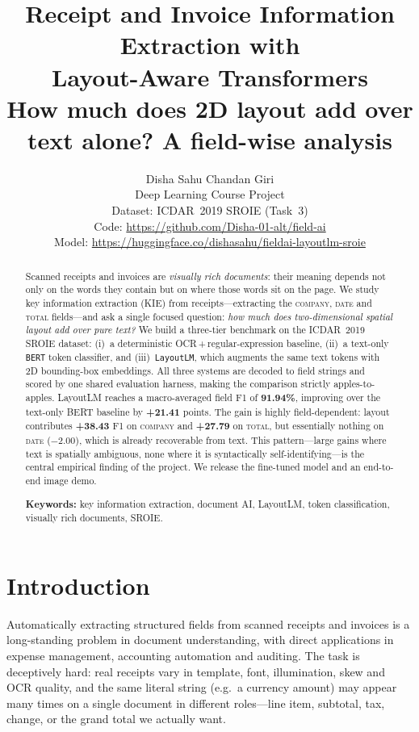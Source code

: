\documentclass[11pt]{article}
\title{\textbf{Receipt and Invoice Information Extraction with\\
Layout-Aware Transformers}\\[0.4em]
\large How much does 2D layout add over text alone? A field-wise analysis}
\author{
\large Disha Sahu \quad Chandan Giri\\[0.5em]
\normalsize Deep Learning Course Project\\[0.6em]
\small Dataset: ICDAR~2019 SROIE (Task~3)\\[0.3em]
\small Code: \url{https://github.com/Disha-01-alt/field-ai}\\[0.3em]
\small Model: \url{https://huggingface.co/dishasahu/fieldai-layoutlm-sroie}
}
\date{}
\begin{document}
\maketitle

\begin{abstract}
\noindent
Scanned receipts and invoices are \emph{visually rich documents}: their meaning
depends not only on the words they contain but on where those words sit on the
page. We study key information extraction (KIE) from receipts---extracting the
\textsc{company}, \textsc{date} and \textsc{total} fields---and ask a single
focused question: \emph{how much does two-dimensional spatial layout add over
pure text?} We build a three-tier benchmark on the ICDAR~2019 SROIE dataset:
(i)~a deterministic OCR\,+\,regular-expression baseline, (ii)~a text-only
\texttt{BERT} token classifier, and (iii)~\texttt{LayoutLM}, which augments the
same text tokens with 2D bounding-box embeddings. All three systems are decoded
to field strings and scored by one shared evaluation harness, making the
comparison strictly apples-to-apples. LayoutLM reaches a macro-averaged
field F1 of \textbf{91.94\%}, improving over the text-only BERT baseline by
\textbf{+21.41} points. The gain is highly field-dependent: layout contributes
\textbf{+38.43} F1 on \textsc{company} and \textbf{+27.79} on \textsc{total},
but essentially nothing on \textsc{date} ($-2.00$), which is already recoverable
from text. This pattern---large gains where text is spatially ambiguous, none
where it is syntactically self-identifying---is the central empirical finding
of the project. We release the fine-tuned model and an end-to-end image demo.

\medskip
\noindent\textbf{Keywords:} key information extraction, document AI, LayoutLM,
token classification, visually rich documents, SROIE.
\end{abstract}

\section{Introduction}
Automatically extracting structured fields from scanned receipts and invoices is
a long-standing problem in document understanding, with direct applications in
expense management, accounting automation and auditing. The task is deceptively
hard: real receipts vary in template, font, illumination, skew and OCR quality,
and the same literal string (e.g.\ a currency amount) may appear many times on a
single document in different roles---line item, subtotal, tax, change, or the
grand total we actually want.
\end{document}

